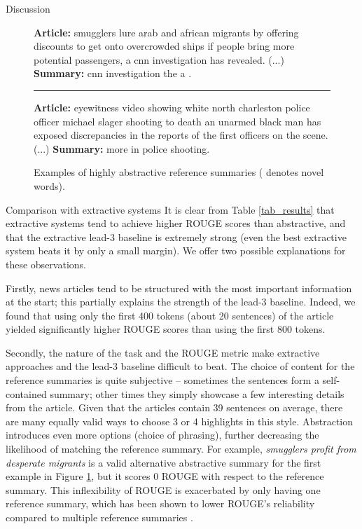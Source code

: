\documentclass[11pt,a4paper]{article}
\begin{document}
\begin{section}{Discussion}
\label{sec_discussion}

\begin{figure}[t]
\begin{boxedminipage}{\columnwidth}
\small
\textbf{Article:} smugglers lure arab and african migrants by offering discounts to get onto overcrowded ships if people bring more potential passengers, a cnn investigation has revealed. (...) \newline
\textbf{Summary:} cnn investigation  the  a .
\newline \rule{\columnwidth}{0.4pt}
\textbf{Article:} eyewitness video showing white north charleston police officer michael slager shooting to death an unarmed black man has exposed discrepancies in the reports of the first officers on the scene. (...) \newline
\textbf{Summary:} more  in  police shooting.
\end{boxedminipage}
\caption{Examples of highly abstractive reference summaries ( denotes novel words).}
\label{fig_abs_ref_exs}
\end{figure}

\begin{subsection}{Comparison with extractive systems}
\label{subsec_lead3}
It is clear from Table \ref{tab_results} that extractive systems tend to achieve higher ROUGE scores than abstractive, and that the extractive lead-3 baseline is extremely strong (even the best extractive system beats it by only a small margin).
We offer two possible explanations for these observations.

Firstly, news articles tend to be structured with the most important information at the start; this partially explains the strength of the lead-3 baseline.
Indeed, we found that using only the first 400 tokens (about 20 sentences) of the article yielded significantly higher ROUGE scores than using the first 800 tokens.

Secondly, the nature of the task and the ROUGE metric make extractive approaches and the lead-3 baseline difficult to beat.
The choice of content for the reference summaries is quite subjective -- sometimes the sentences form a self-contained summary; other times they simply showcase a few interesting details from the article.
Given that the articles contain 39 sentences on average, there are many equally valid ways to choose 3 or 4 highlights in this style.
Abstraction introduces even more options (choice of phrasing), further decreasing the likelihood of matching the reference summary.
For example, \textit{smugglers profit from desperate migrants} is a valid alternative abstractive summary for the first example in Figure \ref{fig_abs_ref_exs}, but it scores 0 ROUGE with respect to the reference summary.
This inflexibility of ROUGE is exacerbated by only having one reference summary, which has been shown to lower ROUGE's reliability compared to multiple reference summaries \cite{lin2004looking}.


\end{subsection}
\end{section}
\end{document}
